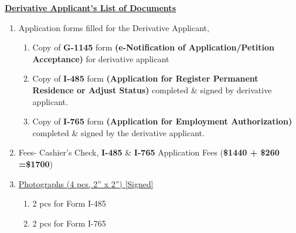 
\begin{center}
\underline{\textbf{Derivative Applicant's List of Documents}}
\end{center}
\begin{enumerate}[label=\textbf{ Exhibit-\arabic*},start=15]
        \item {Application forms filled for the Derivative Applicant,}\begin{enumerate}[label=\roman*.]
       
        \item Copy of \textbf{G-1145} form \textbf{(e-Notification of Application/Petition Acceptance)} for derivative applicant
         \item {Copy of \textbf{I-485} form \textbf{(Application for Register Permanent Residence or Adjust Status)} completed \& signed by derivative applicant.}
        \item Copy of \textbf{I-765} form \textbf{(Application for Employment Authorization)} completed \& signed by the derivative applicant.
    \end{enumerate}
    \item Fees- Cashier's Check, \textbf{I-485} \& \textbf{I-765} Application Fees (\textbf{\$1440 + \$260 =\$1700})
    
    \item \hyperref[mim_exhibit2]{Photographs (4 pcs, 2” x 2”) [Signed]} \begin{enumerate}[label=\roman*.]
        \item {2 pcs for Form I-485}
        \item {2 pcs for Form I-765}
    \end{enumerate}



\end{enumerate}
